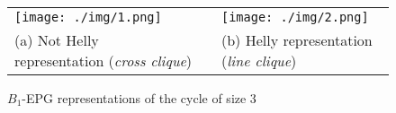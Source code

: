 \begin{figure}[h]
  \centering
  \begin{tabular}{p{3.7cm} p{1.5cm} p{3.3cm}}
     \texttt{[image: ./img/1.png]} & &\texttt{[image: ./img/2.png]}  \\%
    \footnotesize (a) Not Helly representation (\textit{cross clique}) & & \footnotesize (b) Helly representation (\textit{line clique})%
  \end{tabular}
 \caption{$B_{1}$-EPG representations of the cycle of size 3}\label{fig:triangulos}
\end{figure}
